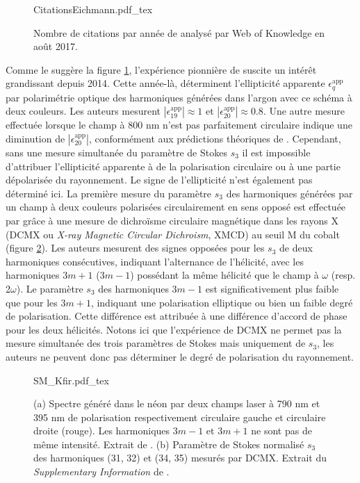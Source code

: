 \begin{figure}[ht]
\centering
\def\svgwidth{0.5\textwidth}
{CitationsEichmann.pdf_tex}
\caption{Nombre de citations par année de  analysé par Web of Knowledge en août 2017.}
\label{fig:CitationsEichmann}
\end{figure}

Comme le suggère la figure \ref{fig:CitationsEichmann}, l'expérience pionnière de  suscite un intérêt grandissant depuis 2014. Cette année-là,  déterminent l'ellipticité apparente $\epsilon_{q}^{\text{app}}$ par polarimétrie optique des harmoniques générées dans l'argon avec ce schéma à deux couleurs. Les auteurs mesurent $|\epsilon_{19}^{\text{app}}| \approx 1 $ et $|\epsilon_{20}^{\text{app}}| \approx 0.8$. Une autre mesure effectuée lorsque le champ à 800 nm n'est pas parfaitement circulaire indique une diminution de $|\epsilon_{20}^{\text{app}}|$, conformément aux prédictions théoriques de . Cependant, sans une mesure simultanée du paramètre de Stokes $s_3$ il est impossible d'attribuer l'ellipticité apparente à de la polarisation circulaire ou à une partie dépolarisée du rayonnement. Le signe de l'ellipticité n'est également pas déterminé ici. La première mesure du paramètre $s_3$ des harmoniques générées par un champ à deux couleurs polarisées circulairement en sens opposé est effectuée par  grâce à une mesure de dichroïsme circulaire magnétique dans les rayons X (DCMX ou \textit{X-ray Magnetic Circular Dichroism}, XMCD) au seuil M du cobalt (figure \ref{fig:SM_Kfir}). Les auteurs mesurent des signes opposées pour les $s_3$ de deux harmoniques consécutives, indiquant l'alternance de l'hélicité, avec les harmoniques $3m+1$ ($3m-1$) possédant la même hélicité que le champ à $\omega$ (resp. 2$\omega$). Le paramètre $s_3$ des harmoniques $3m-1$ est significativement plus faible que pour les $3m+1$, indiquant une polarisation elliptique ou bien un faible degré de polarisation. Cette différence est attribuée à une différence d'accord de phase pour les deux hélicités. Notons ici que l'expérience de DCMX ne permet pas la mesure simultanée des trois paramètres de Stokes mais uniquement de $s_3$, les auteurs ne peuvent donc pas déterminer le degré de polarisation du rayonnement.

\begin{figure}
\centering
\def\svgwidth{\textwidth}
{SM_Kfir.pdf_tex}
\caption{(a) Spectre généré dans le néon par deux champs laser à 790 nm et 395 nm de polarisation respectivement circulaire gauche et circulaire droite (rouge). Les harmoniques $3m-1$ et $3m+1$ ne sont pas de même intensité. Extrait de . (b) Paramètre de Stokes normalisé $s_3$ des harmoniques (31, 32) et (34, 35)  mesurés par DCMX. Extrait du \textit{Supplementary Information} de .}
\label{fig:SM_Kfir}
\end{figure}

